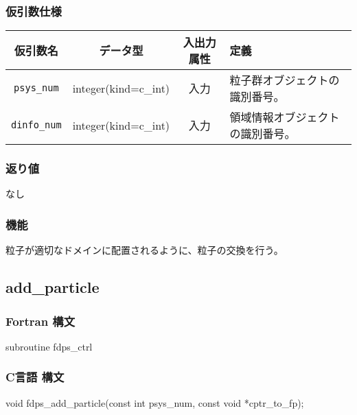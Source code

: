 \subsubsection*{仮引数仕様}
\begin{table}[h]
\begin{tabularx}{\linewidth}{cccX}
\toprule
\rowcolor{Snow2}
仮引数名 & データ型 & 入出力属性 & 定義 \\
\midrule
\texttt{psys\_num} & integer(kind=c\_int) & 入力 & 粒子群オブジェクトの識別番号。\\
\texttt{dinfo\_num} & integer(kind=c\_int) & 入力 & 領域情報オブジェクトの識別番号。\\
\bottomrule
\end{tabularx}
\end{table}

\subsubsection*{返り値}
なし

\subsubsection*{機能}
粒子が適切なドメインに配置されるように、粒子の交換を行う。

\clearpage

\subsection{add\_particle}
\subsubsection*{Fortran 構文}
\begin{screen}
\begin{spverbatim}
subroutine fdps_ctrl%
\end{spverbatim}
\end{screen}

\subsubsection*{C言語 構文}
\begin{screen}
\begin{spverbatim}
void fdps_add_particle(const int psys_num,
                       const void *cptr_to_fp);
\end{spverbatim}
\end{screen}


